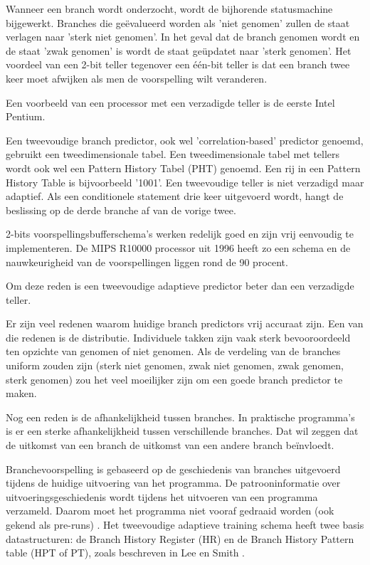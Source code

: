 Wanneer een branch wordt onderzocht, wordt de bijhorende statusmachine bijgewerkt.
Branches die geëvalueerd worden als 'niet genomen' zullen de staat verlagen naar 'sterk niet genomen'.
In het geval dat de branch genomen wordt en de staat 'zwak genomen' is wordt de staat geüpdatet naar 'sterk genomen'.
Het voordeel van een 2-bit teller tegenover een één-bit teller is dat een branch twee keer moet afwijken als men de voorspelling wilt veranderen.

Een voorbeeld van een processor met een verzadigde teller is de eerste Intel Pentium.
\parencite{Fog2018}

Een tweevoudige branch predictor, ook wel 'correlation-based' predictor genoemd, gebruikt een tweedimensionale tabel.
Een tweedimensionale tabel met tellers wordt ook wel een Pattern History Tabel (PHT) genoemd.
Een rij in een Pattern History Table is bijvoorbeeld '1001'.
Een tweevoudige teller is niet verzadigd maar adaptief.
Als een conditionele statement drie keer uitgevoerd wordt, hangt de beslissing op de derde branche af van de vorige twee.

2-bits voorspellingsbufferschema's werken redelijk goed en zijn vrij eenvoudig te implementeren.
De MIPS R10000 processor uit 1996 heeft zo een schema en de nauwkeurigheid van de voorspellingen liggen rond de 90 procent.

Om deze reden is een tweevoudige adaptieve predictor beter dan een verzadigde teller.

Er zijn veel redenen waarom huidige branch predictors vrij accuraat zijn.
Een van die redenen is de distributie.
Individuele takken zijn vaak sterk bevooroordeeld ten opzichte van genomen of niet genomen.
Als de verdeling van de branches uniform zouden zijn (sterk niet genomen, zwak niet genomen, zwak genomen, sterk genomen) zou het veel moeilijker zijn om een goede branch predictor te maken.

Nog een reden is de afhankelijkheid tussen branches. In praktische programma's is er een sterke afhankelijkheid tussen verschillende branches. Dat wil zeggen dat de uitkomst van een branch de uitkomst van een andere branch beïnvloedt.

Branchevoorspelling is gebaseerd op de geschiedenis van
branches uitgevoerd tijdens de huidige uitvoering van
het programma.
De patrooninformatie over uitvoeringsgeschiedenis wordt tijdens het uitvoeren van een programma verzameld.
Daarom moet het programma niet vooraf gedraaid worden (ook gekend als pre-runs) 
\parencite{Yeh1991}.
Het tweevoudige adaptieve training schema heeft twee basis datastructuren: de Branch History Register (HR) en de Branch History Pattern table (HPT of PT), zoals beschreven in Lee en Smith \parencite{Lee1984}.

